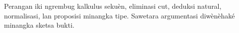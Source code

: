 \documentclass[../../include/open-logic-part]{subfiles}
\begin{document}

\begin{editorial}
Perangan iki ngrembug kalkulus sekuèn, eliminasi cut, deduksi natural, normalisasi, lan proposisi minangka tipe. Sawetara argumentasi diwènèhaké minangka sketsa bukti.
\end{editorial}


\OLEndPartHook
\end{document}
